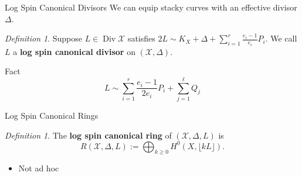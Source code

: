 \documentclass{beamer}
\theoremstyle{remark}
\newtheorem{defn}[thm]{Definition}
\newcommand\BQ{{\mathbb Q}}
\newcommand \sx{{\mathscr X}}
\DeclareMathOperator\di{Div}
\newcommand{\halfcan}{L}
\begin{document}

\begin{frame}{Log Spin Canonical Divisors}
We can equip stacky curves with an effective divisor $\Delta$.





\begin{defn}
Suppose $\halfcan \in \di
\sx$ satisfies $2 \halfcan \sim K_X + \Delta + \sum_{i = 1}^{r}
\frac{e_i - 1}{e_i} P_i$.  We call $\halfcan$ a
\textbf{log spin canonical divisor} on $(\sx, \Delta)$.
\end{defn}

\begin{block}{Fact}
\[
	\halfcan \sim \sum_{i = 1}^{r} \frac{e_i - 1}{2e_i} P_i
	+ \sum_{j = 1}^{\ell} Q_j
\]
\end{block}

\end{frame}


\begin{frame}{Log Spin Canonical Rings}




\begin{defn}
The {\bf log spin canonical ring} of $(\sx, \Delta, \halfcan)$ is
\[
	R(\sx, \Delta, \halfcan) := \bigoplus_{k \geq 0} H^0(X, \lfloor k \halfcan \rfloor).
\]
\end{defn}

\begin{itemize}
\item Not ad hoc
\end{itemize}

\end{frame}
\end{document}
